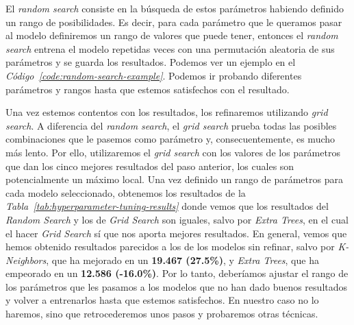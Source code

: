 El \textit{random search} consiste en la búsqueda de estos parámetros habiendo definido un rango de posibilidades. Es decir, para cada parámetro que le queramos pasar al modelo definiremos un rango de valores que puede tener, entonces el \textit{random search} entrena el modelo repetidas veces con una permutación aleatoria de sus parámetros y se guarda los resultados. Podemos ver un ejemplo en el \textit{Código\ \ref{code:random-search-example}}.
Podemos ir probando diferentes parámetros y rangos hasta que estemos satisfechos con el resultado.


Una vez estemos contentos con los resultados, los refinaremos utilizando \textit{grid search}. A diferencia del \textit{random search}, el \textit{grid search} prueba todas las posibles combinaciones que le pasemos como parámetro y, consecuentemente, es mucho más lento. Por ello, utilizaremos el \textit{grid search} con los valores de los parámetros que dan los cinco mejores resultados del paso anterior, los cuales son potencialmente un máximo local. Una vez definido un rango de parámetros para cada modelo seleccionado, obtenemos los resultados de la \textit{Tabla\ \ref{tab:hyperparameter-tuning-results}} donde vemos que los resultados del \textit{Random Search} y los de \textit{Grid Search} son iguales, salvo por \textit{Extra Trees}, en el cual el hacer \textit{Grid Search} sí que nos aporta mejores resultados. En general, vemos que hemos obtenido resultados parecidos a los de los modelos sin refinar, salvo por \textit{K-Neighbors}, que ha mejorado en un \textbf{19.467 (27.5\%)}, y \textit{Extra Trees}, que ha empeorado en un \textbf{12.586 (-16.0\%)}.
Por lo tanto, deberíamos ajustar el rango de los parámetros que les pasamos a los modelos que no han dado buenos resultados y volver a entrenarlos hasta que estemos satisfechos. En nuestro caso no lo haremos, sino que retrocederemos unos pasos y probaremos otras técnicas.

\begin{table}[!h]
    \centering
    \caption{Resultados del primer entrenamiento con hyperparameter tuning. Fuente propia.}\ \label{tab:hyperparameter-tuning-results}
\end{table}
\clearpage

